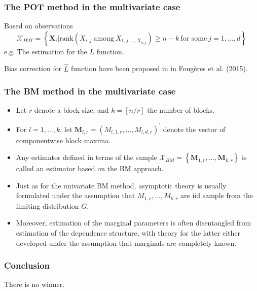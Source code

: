 \documentclass{beamer}
\newcommand{\bX}{\mathbf{X}}
\newcommand{\set}[1]{\left\{#1\right\}}
\begin{document}
\begin{frame}
    \frametitle{The POT method in the multivariate case}
Based on observations 
$$
\mathcal{X}_{POT}=\set{\bX_i| \text{rank}(X_{i,j} \ \text{among}\  X_{1,j,\dots,X_{n,j}})\ge n-k  \ \text{for some}\ j=1,\dots,d}
$$
e.g. The estimation for the $L$ function.

Bias correction for $\hat{L}$ function have been proposed in in Fougères et al. (2015).

\end{frame}

\begin{frame}
    \frametitle{The BM method in the multivariate case}
    \begin{itemize}
        \item    Let $r$ denote a block size, and $k = [n/r]$
        the number of blocks.
        \item For $l=1,\dots,k$, let $\mathbf{M}_{l,r}=(M_{l,1,r},\dots,M_{l,d,r})^{'}$ denote the vector of componentwise block maxima.
        \item  Any estimator defined in terms of the sample $\mathcal{X}_{BM}=\set{\mathbf{M}_{1,r},\dots,\mathbf{M}_{k,r}}$ is called an estimator based on the BM approach.
        \item Just as for the univariate BM method, asymptotic theory is usually formulated under the assumption that $M_{1,r},\dots,M_{k,r}$ are iid sample from the limiting distribution $G$.
        \item Moreover, estimation of the marginal parameters is often
        disentangled from estimation of the dependence structure, with theory for the latter either developed under the assumption that marginals are completely known.
    \end{itemize}
 
    
    
    
    

\end{frame}

\begin{frame}
    \frametitle{Conclusion}
    \begin{center}
        There is no winner.
    \end{center}

    

\end{frame}
\end{document}

